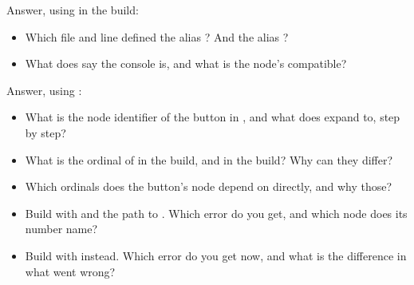 Answer, using  in the  build:

\begin{itemize}
  \item Which file and line defined the alias ? And the alias ?
  \item What does  say the console is, and what is the node’s compatible?
\end{itemize}

\label{c2:ex:4.2}

Answer, using :

\begin{itemize}
  \item What is the node identifier of the button in , and what does 
    expand to, step by step?
  \item What is the ordinal of  in the  build, and in the 
    build? Why can they differ?
  \item Which ordinals does the button’s node depend on directly, and why those?
\end{itemize}

\label{c2:ex:4.3}

\begin{itemize}
  \item Build  with  and the path to
    . Which error do you get, and which node does its
    number name?
  \item Build  with  instead. Which error do you get now, and what is
    the difference in what went wrong?
\end{itemize}
